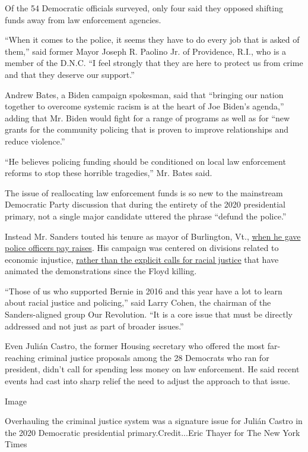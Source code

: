 Of the 54 Democratic officials surveyed, only four said they opposed
shifting funds away from law enforcement agencies.

``When it comes to the police, it seems they have to do every job that
is asked of them,'' said former Mayor Joseph R. Paolino Jr. of
Providence, R.I., who is a member of the D.N.C. ``I feel strongly that
they are here to protect us from crime and that they deserve our
support.''

Andrew Bates, a Biden campaign spokesman, said that ``bringing our
nation together to overcome systemic racism is at the heart of Joe
Biden's agenda,'' adding that Mr. Biden would fight for a range of
programs as well as for ``new grants for the community policing that is
proven to improve relationships and reduce violence.''

``He believes policing funding should be conditioned on local law
enforcement reforms to stop these horrible tragedies,'' Mr. Bates said.

The issue of reallocating law enforcement funds is so new to the
mainstream Democratic Party discussion that during the entirety of the
2020 presidential primary, not a single major candidate uttered the
phrase ``defund the police.''

Instead Mr. Sanders touted his tenure as mayor of Burlington, Vt.,
\href{https://www.nytimes3xbfgragh.onion/2015/11/26/us/politics/as-mayor-bernie-sanders-was-more-pragmatic-than-socialist.html}{when
he gave police officers pay raises}. His campaign was centered on
divisions related to economic injustice,
\href{https://www.nytimes3xbfgragh.onion/2020/06/19/us/politics/bernie-sanders-protests.html}{rather
than the explicit calls for racial justice} that have animated the
demonstrations since the Floyd killing.

``Those of us who supported Bernie in 2016 and this year have a lot to
learn about racial justice and policing,'' said Larry Cohen, the
chairman of the Sanders-aligned group Our Revolution. ``It is a core
issue that must be directly addressed and not just as part of broader
issues.''

Even Julián Castro, the former Housing secretary who offered the most
far-reaching criminal justice proposals among the 28 Democrats who ran
for president, didn't call for spending less money on law enforcement.
He said recent events had cast into sharp relief the need to adjust the
approach to that issue.

Image

Overhauling the criminal justice system was a signature issue for Julián
Castro in the 2020 Democratic presidential primary.Credit...Eric Thayer
for The New York Times

